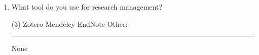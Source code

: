 \documentclass[a4paper,12pt]{article}
\begin{document}
\begin{enumerate}[resume]
\begin{tasks}
\end{tasks}
\item What tool do you use for research management?
\begin{tasks}(3)
    \task Zotero
    \task Mendeley
    \task EndNote
    \task Other: \rule{2.5cm}{0.4pt}
    \task None
\end{tasks}
\end{enumerate}
\end{document}
